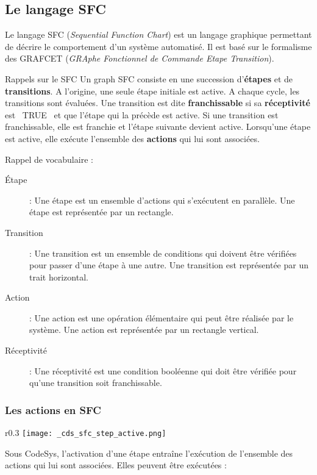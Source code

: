 \subsection{Le langage SFC}
Le langage SFC (\textit{Sequential Function Chart}) est un langage graphique permettant de décrire le comportement d'un système automatisé. Il est basé sur le formalisme des GRAFCET (\textit{GRAphe Fonctionnel de Commande Etape Transition}).


\begin{UPSTIinfor}{Rappels sur le SFC}
Un graph SFC consiste en une succession d'\textbf{étapes} et de \textbf{transitions}. A l'origine, une seule étape initiale est active. A chaque cycle, les transitions sont évaluées. Une transition est dite \textbf{franchissable} si sa \textbf{réceptivité} est ~TRUE~ et que l'étape qui la précède est active.
Si une transition est franchissable, elle est franchie et l'étape suivante devient active.
Lorsqu'une étape est active, elle exécute l'ensemble des \textbf{actions} qui lui sont associées.

Rappel de vocabulaire : 
\begin{description}
    \item[Étape] : Une étape est un ensemble d'actions qui s'exécutent en parallèle. Une étape est représentée par un rectangle. 
    \item[Transition] : Une transition est un ensemble de conditions qui doivent être vérifiées pour passer d'une étape à une autre. Une transition est représentée par un trait horizontal. 
    \item[Action] : Une action est une opération élémentaire qui peut être réalisée par le système. Une action est représentée par un rectangle vertical.
    \item[Réceptivité] : Une réceptivité est une condition booléenne qui doit être vérifiée pour qu'une transition soit franchissable.
\end{description}
\end{UPSTIinfor}

\subsubsection{Les actions en SFC}

\begin{wrapfigure}{r}{0.3\linewidth}
    \centering
    \texttt{[image: \_cds\_sfc\_step\_active.png]}
    \caption{Action en SFC}
    \label{fig:ActionSFC}
\end{wrapfigure}
Sous CodeSys, l'activation d'une étape entraîne l'exécution de l'ensemble des actions qui lui sont associées. Elles peuvent être exécutées : 

